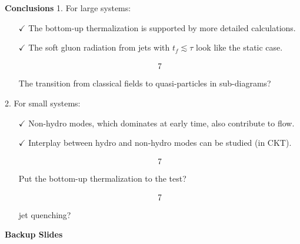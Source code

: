 \documentclass[9pt,a4paper,unknownkeysallowed,xcolor=dvipsnames,aspectratio=43]{beamer}
\begin{document}
\begin{frame}{\bf\huge Conclusions}
\setcounter{page}{0}
\vspace{4mm}
{\color{teablue}1.} {\color{darkred}For large systems:}\\
\vspace{2mm}
\begin{enumerate}
    \item[$\checkmark$]{The bottom-up thermalization is supported by more detailed calculations.}
    \vspace{2mm}
    \item[$\checkmark$]{The soft gluon radiation from jets with $t_f\lesssim \tau$ look like the static case.}
    \vspace{2mm}
    \item[$$\ding{55}$$]{The transition from classical fields to quasi-particles in sub-diagrams?}
\end{enumerate}
\vspace{2mm}
{\color{teablue}2.} {\color{darkred} For small systems:}\\
\vspace{2mm}
\begin{enumerate}
    \item[$\checkmark$]{Non-hydro modes, which dominates at early time, also contribute to flow.}
    \vspace{2mm}
    \item[$\checkmark$]{Interplay between hydro and non-hydro modes can be studied (in CKT).}
    \vspace{2mm}
    \item[$$\ding{55}$$]{Put the bottom-up thermalization to the test?}
    \vspace{2mm}
    \item[$$\ding{55}$$]{jet quenching?}
\end{enumerate}

\vspace{2mm}
\end{frame}
%
%
\begin{frame}
\setcounter{page}{0}
\vspace*{\fill}
\begin{center}
{\Huge\bf\color{gray}Backup Slides}
\end{center}
\vspace*{\fill}
\end{frame}
\end{document}
